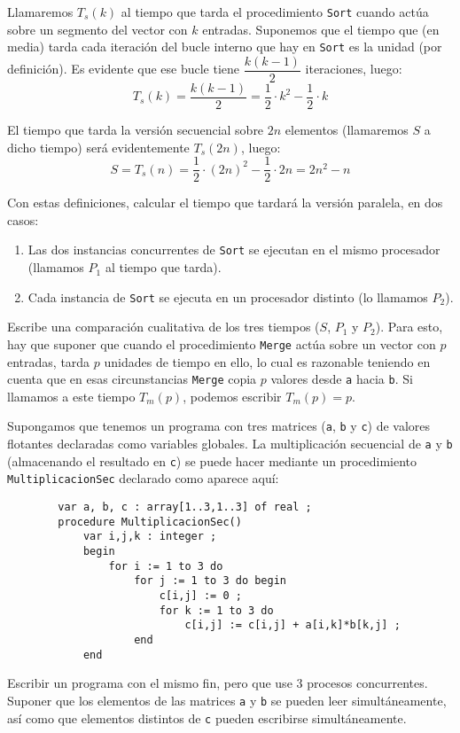 \begin{ejercicio}
    Llamaremos $T_s(k)$ al tiempo que tarda el procedimiento \verb|Sort| cuando actúa sobre un segmento del vector con $k$ entradas. Suponemos que el tiempo que (en media) tarda cada iteración del bucle interno que hay en \verb|Sort| es la unidad (por definición). Es evidente que ese bucle tiene $\dfrac{k(k-1)}{2}$ iteraciones, luego:
    \[
        T_s(k) = \dfrac{k(k-1)}{2} = \dfrac{1}{2}\cdot k^2 - \dfrac{1}{2}\cdot k
    \]

    El tiempo que tarda la versión secuencial sobre $2n$ elementos (llamaremos $S$ a dicho tiempo) será evidentemente $T_s(2n)$, luego:
    \[
        S = T_s(n) = \dfrac{1}{2}\cdot (2n)^2 - \dfrac{1}{2}\cdot 2n = 2n^2 - n
    \]

    Con estas definiciones, calcular el tiempo que tardará la versión paralela, en dos casos:
    \begin{enumerate}
        \item Las dos instancias concurrentes de \verb|Sort| se ejecutan en el mismo procesador (llamamos $P_1$ al tiempo que tarda).
        \item Cada instancia de \verb|Sort| se ejecuta en un procesador distinto (lo llamamos $P_2$).
    \end{enumerate}

    Escribe una comparación cualitativa de los tres tiempos ($S$, $P_1$ y $P_2$). Para esto, hay que suponer que cuando el procedimiento \verb|Merge| actúa sobre un vector con $p$ entradas, tarda $p$ unidades de tiempo en ello, lo cual es razonable teniendo en cuenta que en esas circunstancias \verb|Merge| copia $p$ valores desde \verb|a| hacia \verb|b|. Si llamamos a este tiempo $T_m(p)$, podemos escribir $T_m(p) = p$.

\end{ejercicio}

\begin{ejercicio} \label{ej:7}
    Supongamos que tenemos un programa con tres matrices (\verb|a|, \verb|b| y \verb|c|) de valores flotantes declaradas
    como variables globales. La multiplicación secuencial de \verb|a| y \verb|b| (almacenando el resultado en \verb|c|)
    se puede hacer mediante un procedimiento \verb|MultiplicacionSec| declarado como aparece aquí:
    \begin{verbatim}
        var a, b, c : array[1..3,1..3] of real ;
        procedure MultiplicacionSec()
            var i,j,k : integer ;
            begin
                for i := 1 to 3 do
                    for j := 1 to 3 do begin
                        c[i,j] := 0 ;
                        for k := 1 to 3 do
                            c[i,j] := c[i,j] + a[i,k]*b[k,j] ;
                    end
            end
    \end{verbatim}
    Escribir un programa con el mismo fin, pero que use 3 procesos concurrentes. Suponer que
    los elementos de las matrices \verb|a| y \verb|b| se pueden leer simultáneamente, así como que elementos
    distintos de \verb|c| pueden escribirse simultáneamente.
\end{ejercicio}

